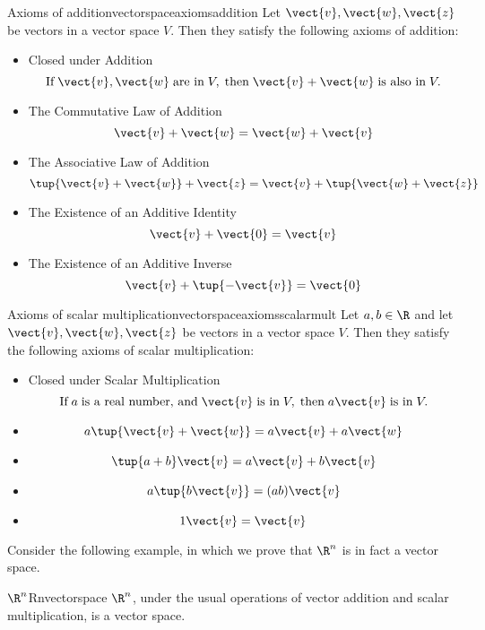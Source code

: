 \begin{definition}{Axioms of addition}{vectorspaceaxiomsaddition}
Let $\vect{v}, \vect{w}, \vect{z}$ be vectors in a vector space $V$. Then they satisfy the following axioms of addition:

\begin{itemize}
\item Closed under Addition
\[ \mbox{If}\; \vect{v}, \vect{w} \;\mbox{are in}\; V, \;\mbox{then}\; \vect{v}+\vect{w} \;\mbox{is also in}\; V.
\] 
\item The Commutative Law of Addition
\[
\vect{v}+\vect{w}=\vect{w}+\vect{v}
\]
\item The Associative Law of Addition
\[
\tup{\vect{v}+\vect{w}} +\vect{z}=\vect{v}+\tup{\vect{w}+
\vect{z}} 
\]
\item The Existence of an Additive Identity
\[
\vect{v}+\vect{0}=\vect{v}
\]
\item The Existence of an Additive Inverse
\[
\vect{v}+\tup{-\vect{v}} =\vect{0}
\]
\end{itemize}
\end{definition}

\begin{definition}{Axioms of scalar multiplication}{vectorspaceaxiomsscalarmult}
Let $a, b \in \R$ and let $\vect{v}, \vect{w}, \vect{z}$ be vectors in a vector space $V$. Then they satisfy the following axioms of scalar multiplication:

\begin{itemize}
\item Closed under Scalar Multiplication
\[ \mbox{If}\; a \;\mbox{is a real number, and}\; \vect{v} \;\mbox{is in}\; V, \;\mbox{then}\; a\vect{v} \;\mbox{is in}\; V.
\]
\item
\[
a \tup{\vect{v}+\vect{w}} = a \vect{v}+ a \vect{w}  \label{e.01}
\]
\item
\[
\tup{a + b } \vect{v}= a \vect{v}+ b \vect{v}
\label{e.02}
\]
\item
\[
a \tup{b \vect{v}} = (a b) \vect{v}
\label{e.03}
\]
\item
\[
1\vect{v}=\vect{v}  \label{e.04}
\]
\end{itemize}
\end{definition}

Consider the following example, in which we prove that $\R^n$ is in fact a vector space.

\begin{example}{$\R^n$}{Rnvectorspace}
$\R^n$, under the usual operations of vector addition and scalar multiplication, is a vector space.
\end{example}

